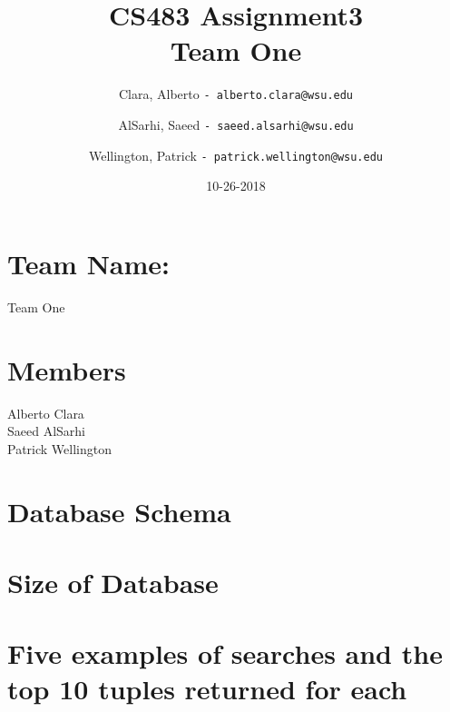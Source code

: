 \documentclass[11pt]{article}
\title{CS483 Assignment3 \\
\large Team One}
\author{
  Clara, Alberto      \texttt{- alberto.clara@wsu.edu}
  \and
  AlSarhi, Saeed      \texttt{- saeed.alsarhi@wsu.edu}
  \and
  Wellington, Patrick      \texttt{- patrick.wellington@wsu.edu}
}
\date{10-26-2018}
\begin{document}
\maketitle

\section{Team Name:}
Team One

\section{Members}
Alberto Clara \\
Saeed AlSarhi \\
Patrick Wellington

\section{Database Schema}


\section{Size of Database}

\section{Five examples of searches and the top 10 tuples returned for each}

\end{document}
